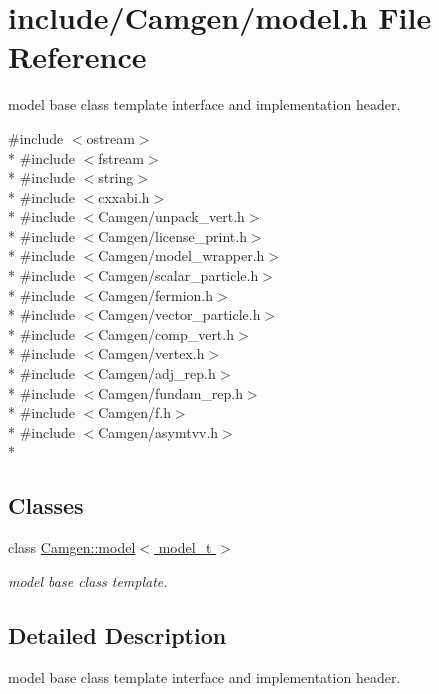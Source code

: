 \hypertarget{a00675}{\section{include/\-Camgen/model.h File Reference}
\label{a00675}
}


model base class template interface and implementation header.  


{\ttfamily \#include $<$ostream$>$}\\*
{\ttfamily \#include $<$fstream$>$}\\*
{\ttfamily \#include $<$string$>$}\\*
{\ttfamily \#include $<$cxxabi.\-h$>$}\\*
{\ttfamily \#include $<$Camgen/unpack\-\_\-vert.\-h$>$}\\*
{\ttfamily \#include $<$Camgen/license\-\_\-print.\-h$>$}\\*
{\ttfamily \#include $<$Camgen/model\-\_\-wrapper.\-h$>$}\\*
{\ttfamily \#include $<$Camgen/scalar\-\_\-particle.\-h$>$}\\*
{\ttfamily \#include $<$Camgen/fermion.\-h$>$}\\*
{\ttfamily \#include $<$Camgen/vector\-\_\-particle.\-h$>$}\\*
{\ttfamily \#include $<$Camgen/comp\-\_\-vert.\-h$>$}\\*
{\ttfamily \#include $<$Camgen/vertex.\-h$>$}\\*
{\ttfamily \#include $<$Camgen/adj\-\_\-rep.\-h$>$}\\*
{\ttfamily \#include $<$Camgen/fundam\-\_\-rep.\-h$>$}\\*
{\ttfamily \#include $<$Camgen/f.\-h$>$}\\*
{\ttfamily \#include $<$Camgen/asymtvv.\-h$>$}\\*
\subsection*{Classes}
\begin{DoxyCompactItemize}
\item 
class \hyperlink{a00370}{Camgen\-::model$<$ model\-\_\-t $>$}
\begin{DoxyCompactList}\small\item\em model base class template. \end{DoxyCompactList}\end{DoxyCompactItemize}


\subsection{Detailed Description}
model base class template interface and implementation header. 